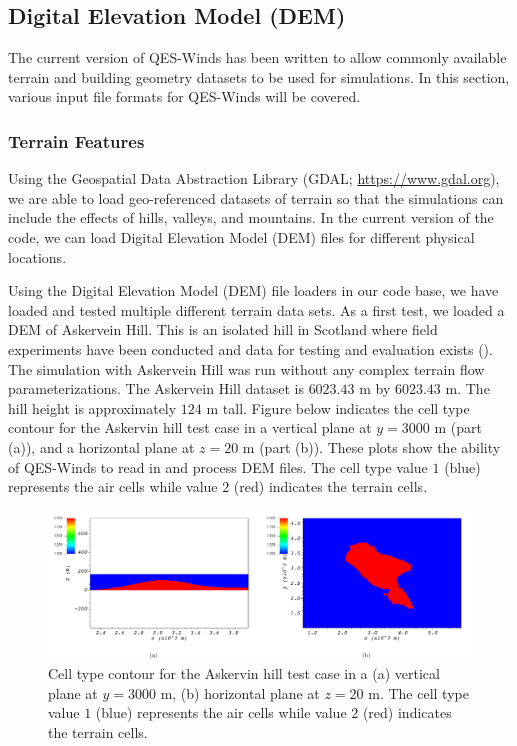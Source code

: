 \subsection{Digital Elevation Model (DEM)}

The current version of QES-Winds has been written to allow commonly available terrain and building geometry datasets to be used for simulations. In this section, various input file formats for QES-Winds will be covered.

\subsubsection{Terrain Features}

Using the Geospatial Data Abstraction Library (GDAL; \href{https://www.gdal.org}{https://www.gdal.org}), we are able to load geo-referenced datasets of terrain so that the simulations can include the effects of hills, valleys, and mountains. In the current version of the code, we can load Digital Elevation Model (DEM) files for different physical locations.

Using the Digital Elevation Model (DEM) file loaders in our code base, we have loaded and tested multiple different terrain data sets. As a first test, we loaded a DEM of Askervein Hill. This is an isolated hill in Scotland where field experiments have been conducted and data for testing and evaluation exists (\cite{taylor1987askervein,mickle1988askervein}). The simulation with Askervein Hill was run without any complex terrain flow parameterizations. The Askervein Hill dataset is $6023.43$ m by $6023.43$ m. The hill height is approximately $124$ m tall. Figure below indicates the cell type contour for the Askervin hill test case in a vertical plane at $y = 3000$ m (part (a)), and a horizontal plane at $z=20$ m (part (b)). These plots show the ability of QES-Winds to read in and process DEM files. The cell type value $1$ (blue) represents the air cells while value $2$ (red) indicates the terrain cells.

\begin{figure}[h]
    \centering
    \includegraphics[width=\textwidth]{Images/askervein.pdf}
    \caption{Cell type contour for the Askervin hill test case in a (a) vertical plane at $y=3000$ m, (b) horizontal plane at $z=20$ m. The cell type value $1$ (blue) represents the air cells while value $2$ (red) indicates the terrain cells.}
\end{figure}

